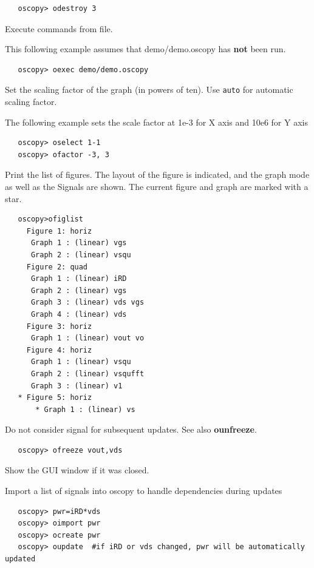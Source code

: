 \documentclass[a4paper,11pt]{article}
\begin{document}
\begin{verbatim}
   oscopy> odestroy 3
\end{verbatim}

   Execute commands from file.

   This following example assumes that demo/demo.oscopy has \textbf{not} been run.

\begin{verbatim}
   oscopy> oexec demo/demo.oscopy
\end{verbatim}

   Set the scaling factor of the graph (in powers of ten). Use \texttt{auto} for automatic scaling factor.

\noindent   The following example sets the scale factor at 1e-3 for X axis and 10e6 for Y axis
\begin{verbatim}
   oscopy> oselect 1-1
   oscopy> ofactor -3, 3
\end{verbatim}

   Print the list of figures. The layout of the figure is indicated, and the graph mode as well as the Signals are shown. The current figure and graph are marked with a star.
\begin{verbatim}
   oscopy>ofiglist
     Figure 1: horiz
      Graph 1 : (linear) vgs
      Graph 2 : (linear) vsqu
     Figure 2: quad
      Graph 1 : (linear) iRD
      Graph 2 : (linear) vgs
      Graph 3 : (linear) vds vgs
      Graph 4 : (linear) vds
     Figure 3: horiz
      Graph 1 : (linear) vout vo
     Figure 4: horiz
      Graph 1 : (linear) vsqu
      Graph 2 : (linear) vsqufft
      Graph 3 : (linear) v1
   * Figure 5: horiz
       * Graph 1 : (linear) vs
\end{verbatim}

   Do not consider signal for subsequent updates. See also \textbf{ounfreeze}.
\begin{verbatim}
   oscopy> ofreeze vout,vds
\end{verbatim}

   Show the GUI window if it was closed.

   Import a list of signals into oscopy to handle dependencies during updates
\begin{verbatim}
   oscopy> pwr=iRD*vds
   oscopy> oimport pwr
   oscopy> ocreate pwr
   oscopy> oupdate  #if iRD or vds changed, pwr will be automatically updated
\end{verbatim}
\end{document}

